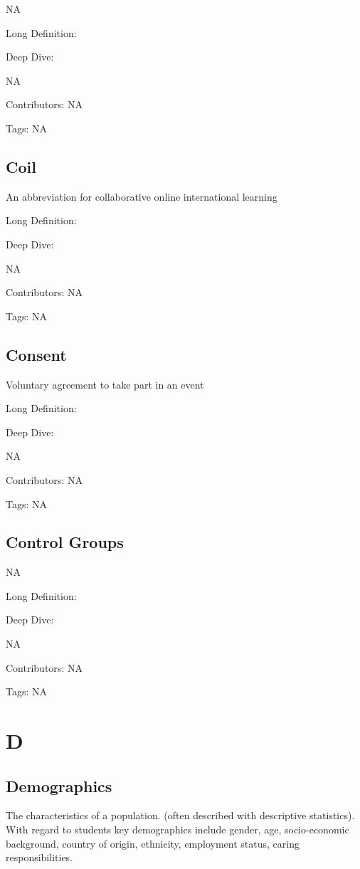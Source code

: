 \documentclass[
  letterpaper,
  DIV=11,
  numbers=noendperiod]{scrreprt}
\begin{document}
NA

Long Definition:

Deep Dive:

NA

Contributors: NA

Tags: NA

\section{Coil}\label{coil}

An abbreviation for collaborative online international learning

Long Definition:

Deep Dive:

NA

Contributors: NA

Tags: NA

\section{Consent}\label{consent}

Voluntary agreement to take part in an event

Long Definition:

Deep Dive:

NA

Contributors: NA

Tags: NA

\section{Control Groups}\label{control-groups}

NA

Long Definition:

Deep Dive:

NA

Contributors: NA

Tags: NA


\chapter{D}\label{d}

\section{Demographics}\label{demographics}

The characteristics of a population. (often described with descriptive
statistics). With regard to students key demographics include gender,
age, socio-economic background, country of origin, ethnicity, employment
status, caring responsibilities.
\end{document}
